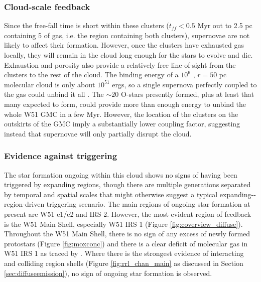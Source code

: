 \subsubsection{Cloud-scale feedback}
Since the free-fall time is short within these clusters ($t_{ff} < 0.5$ Myr out
to 2.5 pc containing 5 \msun of gas, i.e. the region containing both
clusters), supernovae are not likely
to affect their formation.  However, once the clusters have exhausted gas
locally, they
will remain in the cloud long enough for the stars to evolve and die.
Exhaustion and porosity also provide a relatively free line-of-sight from the
clusters to the rest
of the cloud.  The binding energy of a $10^6$ \msun, $r=50$ pc 
molecular cloud is only about $10^{51}$ ergs, so a single supernova perfectly
coupled to the gas could unbind it all \citep[though typical energy delivered
to molecular clouds is lower, $\sim0.01-0.25$; see references in][appendix
B]{Kruijssen2012a}.  The $\sim20$ O-stars presently formed,
plus at least that many expected to form, could provide more than enough energy
to unbind the whole W51 GMC in a few Myr.  However, the location of the clusters
on the outskirts of the GMC imply a substantially lower coupling factor,
suggesting instead that supernovae will only partially disrupt the cloud.

\subsubsection{Evidence against triggering}
The star formation ongoing within this cloud shows no signs of having been
triggered by expanding \hii regions, though there are multiple generations
separated by temporal and spatial scales that might otherwise suggest a typical
expanding-\hii-region-driven triggering
scenario.  The main regions of ongoing star formation at present are W51 e1/e2
and IRS 2.  However, the most evident region of feedback is the W51 Main Shell,
especially W51 IRS 1 
(Figure \ref{fig:coverview_diffuse}).  Throughout the W51 Main Shell, there is no sign
of any excess of newly formed protostars (Figure \ref{fig:moxconc}) and there
is a clear deficit of molecular gas in W51 IRS 1 as traced by \ceighteeno \citep[Figure
\ref{fig:contonco};][]{Parsons2012a}.  Where there is the
strongest evidence of interacting and colliding \hii region shells (Figure
\ref{fig:rrl_chan_main} as discussed in Section \ref{sec:diffuseemission}),
no sign of ongoing star formation is observed.


